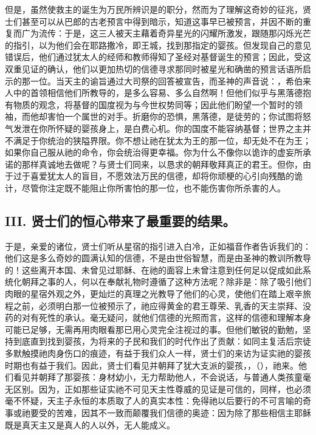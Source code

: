 但是，虽然使救主的诞生为万民所辨识是的职分，然而为了理解这奇妙的征兆，贤士们甚至可以从巴郎的古老预言中得到暗示，知道这事早已被预言，并因不断的重复而广为流传：于是，这三人被天主藉着奇异星光的闪耀所激发，跟随那闪烁光芒的指引，以为他们会在耶路撒冷，即王城，找到那指定的婴孩。但发现自己的意见错误后，他们通过犹太人的经师和教师得知了圣经对基督诞生的预言；因此，受这双重见证的确认，他们以更加热切的信德寻求那同时被星光和确凿的预言话语所启示的那一位。当天主的谕旨通过大司祭的回答被宣告，而圣神的声音说：，希伯来人中的首领相信他们所教导的，是多么容易、多么自然啊！但他们似乎与黑落德抱有物质的观念，将基督的国度视为与今世权势同等；因此他们盼望一个暂时的领袖，而他却害怕一个属世的对手。折磨你的恐惧，黑落德，是徒劳的；你试图将怒气发泄在你所怀疑的婴孩身上，是白费心机。你的国度不能容纳基督；世界之主并不满足于你统治的狭隘界限。你不想让祂在犹太为王的那一位，却无处不在为王；如果你自己服从祂的命令，你会统治得更幸福。你为什么不像你以诡诈的虚妄所承诺的那样真诚地去做呢？与贤士们同来，以恳求的朝拜敬拜真正的君王。但你，由于过于喜爱犹太人的盲目，不愿效法万民的信德，却将你顽梗的心引向残酷的诡计，尽管你注定既不能阻止你所害怕的那一位，也不能伤害你所杀害的人。\par


\subsection{III. 贤士们的恒心带来了最重要的结果。}

于是，亲爱的诸位，贤士们听从星宿的指引进入白冷，正如福音作者告诉我们的：他们这是多么奇妙的圆满认知的信德，不是由世俗智慧，而是由圣神的教训所教导的！这些离开本国、未曾见过耶稣、在祂的面容上未曾注意到任何足以促成如此系统化朝拜之事的人，何以在奉献礼物时遵循了这种方法呢？除非是：除了吸引他们肉眼的星宿外观之外，更灿烂的真理之光教导了他们的心灵，使他们在踏上艰辛旅程之前，必须明白那一位被预示了，祂应得黄金的君王尊荣、乳香的天主崇拜、没药的对有死性的承认。毫无疑问，就他们信德的光照而言，这样的信德和理解本身可能已足够，无需再用肉眼看那已用心灵完全注视过的事。但他们敏锐的勤勉，坚持到底直到找到婴孩，为将来的子民和我们的时代作出了贡献：如同主复活后宗徒多默触摸祂肉身伤口的痕迹，有益于我们众人一样，贤士们的来访为证实祂的婴孩时期也有益于我们。因此，贤士们看见并朝拜了犹大支派的婴孩，，（），祂来。他们看见并朝拜了那婴孩：身材幼小，无力帮助他人，不会说话，与普通人类孩童毫无区别。因为，正如那些证实祂不可见天主性尊威的见证是可信的，同样，也必须毫不怀疑，天主子永恒的本质取了人的真实本性：免得祂以后要行的不可言喻的奇事或祂要受的苦难，因其不一致而颠覆我们信德的奥迹：因为除了那些相信主耶稣既是真天主又是真人的人以外，无人能成义。\par

